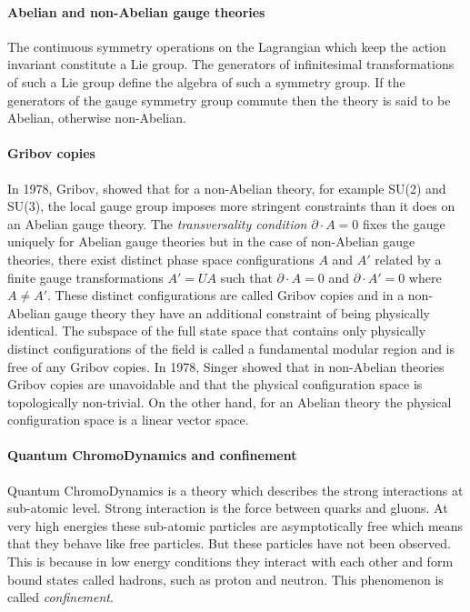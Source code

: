 \paragraph{Abelian and non-Abelian gauge theories}
The continuous symmetry operations on the Lagrangian which keep the action invariant constitute a Lie group. The generators of infinitesimal transformations of such a Lie group define the algebra of such a symmetry group. If the generators of the gauge symmetry group commute then the theory is said to be Abelian, otherwise non-Abelian.

\paragraph{Gribov copies}
In 1978, Gribov, showed that for a non-Abelian theory, for
example SU(2) and SU(3), the local gauge group imposes more stringent
constraints than it does on an Abelian gauge theory. The
\emph{transversality condition} $ \partial \cdot A=0$ fixes the gauge
uniquely for Abelian gauge theories but in the case of non-Abelian gauge
theories, there exist distinct phase space configurations $A$ and $A'$
related by a finite gauge transformations $A' = U A$ such that
$\partial\cdot A=0$ and $\partial\cdot A'=0$ where $A \neq A'$. These
distinct configurations are called Gribov copies and in a non-Abelian
gauge theory they have an additional constraint of being physically
identical. The subspace of the full state space that contains only
physically distinct configurations of the field is called a fundamental
modular region and is free of any Gribov copies. In 1978,
Singer showed that in non-Abelian theories Gribov copies are
unavoidable and that the physical configuration space is topologically
non-trivial. On the other hand, for an Abelian theory the physical
configuration space is a linear vector space.

\paragraph{Quantum ChromoDynamics and confinement}
Quantum ChromoDynamics is a theory which describes the strong
interactions at sub-atomic level. Strong interaction is the force between
quarks and gluons. At very high energies these sub-atomic particles are
asymptotically free which means that they behave like free particles. But
these particles have not been observed. This is because in low energy
conditions they interact with each other and form bound states called
hadrons, such as proton and neutron. This phenomenon is called
\emph{confinement}.

